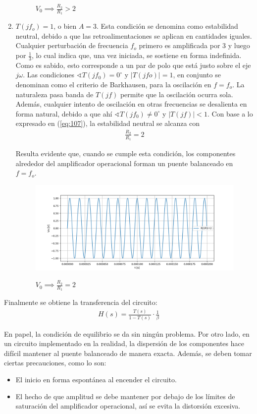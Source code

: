 \begin{enumerate}
\begin{figure}[H]
	\label{fig:r1r2g}
	\caption{$V_0 \implies \frac{R_2}{R_1}>2$}
\end{figure}
\item  $T(jf_o) = 1$, o bien $A= 3$. Esta condición se denomina como estabilidad neutral, debido a que las retroalimentaciones se aplican en cantidades iguales. Cualquier perturbación de frecuencia $f_o$ primero es amplificada por 3 y luego por $\frac{1}{3}$, lo cual indica que, una vez iniciada, se sostiene en forma indefinida. Como es sabido, esto corresponde a un par de polo que está justo sobre el eje $j \omega$. Las condiciones $\sphericalangle T(jf_0)= 0^\circ$ y $|T(jfo)|= 1$, en conjunto se denominan como el criterio de Barkhausen, para la oscilación en $f=f_o$. La naturaleza pasa banda de $T(jf)$ permite que la oscilación ocurra sola. Además, cualquier intento de oscilación en otras frecuencias se desalienta en forma natural, debido a que ahí $\sphericalangle T(jf_0) \neq 0^\circ$ y $|T(jf)| < 1$. Con base a lo expresado en (\ref{eq:107}), la estabilidad neutral se alcanza con 
\begin{align}
\frac{R_2}{R_1}=2
\end{align}

Resulta evidente que, cuando se cumple esta condición, los componentes alrededor del amplificador operacional forman un puente balanceado en $f=f_o$.
\begin{figure}[H]
	\centering
	\includegraphics[width=\textwidth]{Imagenes-Ej1/r2r1e.png}
	\label{fig:r1r2e}
	\caption{$V_0 \implies \frac{R_2}{R_1}=2$}
\end{figure}
\end{enumerate}

Finalmente se obtiene la transferencia del circuito:
\begin{align}
H(s)=\frac{T(s)}{1-T(s)}\cdot \frac{1}{\beta}
\end{align}

En papel, la condición de equilibrio se da sin ningún problema. Por otro lado, en un circuito implementado en la realidad, la dispersión de los componentes hace difícil mantener al puente balanceado de manera exacta. Además, se deben tomar ciertas precauciones, como lo son: 
\begin{itemize}
\item El inicio en forma espontánea al encender el circuito.
\item El hecho de que amplitud se debe mantener por debajo de los límites de saturación del amplificador operacional, así se evita la distorsión excesiva.
\end{itemize}

